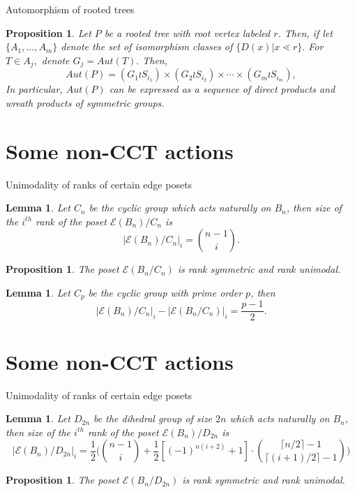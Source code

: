 \documentclass{beamer}
\newtheorem{lem}[thm]{Lemma}
\newtheorem{prop}[thm]{Proposition}
\theoremstyle{remark}
\begin{document}
\begin{frame}{Automorphism of rooted trees}
\begin{prop}
Let $P$ be a rooted tree with root vertex labeled $r$. Then, if let $\{A_1,\ldots,A_m\}$ denote the set of isomorphism classes of $\{D(x)|x\lessdot r\}.$ For $T \in A_j,$ denote $G_j = Aut(T).$ Then, 
$$Aut(P) = (G_1 \wr S_{i_1}) \times (G_2 \wr S_{i_2}) \times \cdots \times (G_m\wr S_{i_m}),$$
In particular, $Aut(P)$ can be expressed as a sequence of direct products and wreath products of symmetric groups.
\end{prop}
\end{frame}






\section{Some non-CCT actions}

\begin{frame}{Unimodality of ranks of certain edge posets}
\begin{lem}
Let $C_n$ be the cyclic group which acts naturally on $B_n$, then size of the $i^{th}$ rank of the poset $\mathcal E (B_n)/C_n$ is $$|\mathcal E (B_n)/C_n|_{i} = \binom{n-1}{i}.$$
\end{lem}
\pause
\begin{prop}
The poset $\mathcal E (B_n/C_n)$ is rank symmetric and rank unimodal.
\end{prop}
\pause
\begin{lem}
Let $C_p$ be the cyclic group with prime order $p$, then  $$|\mathcal E (B_n)/C_n|_{i} - |\mathcal E(B_n/C_n)|_i = \frac{p-1}{2}.$$
\end{lem}
\end{frame}





\section{Some non-CCT actions}
\begin{frame}{Unimodality of ranks of certain edge posets}
\begin{lem}
Let $D_{2n}$ be the dihedral group of size $2n$ which acts naturally on $B_n$, then size of the $i^{th}$ rank of the poset $\mathcal E (B_n)/D_{2n}$ is
$$|\mathcal E (B_n)/D_{2n}|_{i}  = \frac{1}{2} \Big( {n-1 \choose i } + \frac{1}{2} [(-1)^{n(i+2)}+1] \cdot { \lceil n/2\rceil -1  \choose \lceil (i+1)/2 \rceil - 1}  \Big)$$
\end{lem}
\pause
\begin{prop}
The poset $\mathcal E (B_n/D_{2n})$ is rank symmetric and rank unimodal.
\end{prop}
\end{frame}
\end{document}
